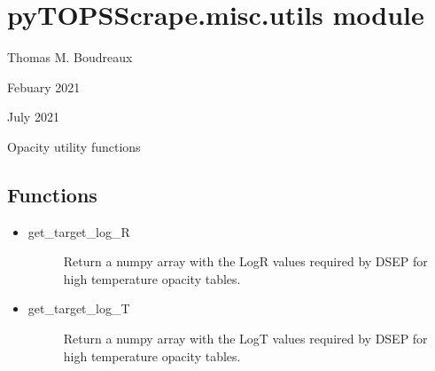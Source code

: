 \documentclass[letterpaper,10pt,english]{sphinxmanual}
\begin{document}
\section{pyTOPSScrape.misc.utils module}
\label{\detokenize{pyTOPSScrape.misc:module-pyTOPSScrape.misc.utils}}\label{\detokenize{pyTOPSScrape.misc:pytopsscrape-misc-utils-module}}
\sphinxAtStartPar
{} Thomas M. Boudreaux

\sphinxAtStartPar
{} Febuary 2021

\sphinxAtStartPar
{} July 2021

\sphinxAtStartPar
Opacity utility functions


\subsection{Functions}
\label{\detokenize{pyTOPSScrape.misc:functions}}\begin{itemize}
\item {} \begin{description}
\item[{get\_target\_log\_R}] \leavevmode
\sphinxAtStartPar
Return a numpy array with the LogR values required by DSEP for high temperature opacity tables.

\end{description}

\item {} \begin{description}
\item[{get\_target\_log\_T}] \leavevmode
\sphinxAtStartPar
Return a numpy array with the LogT values required by DSEP for high temperature opacity tables.

\end{description}

\end{itemize}
\end{document}
